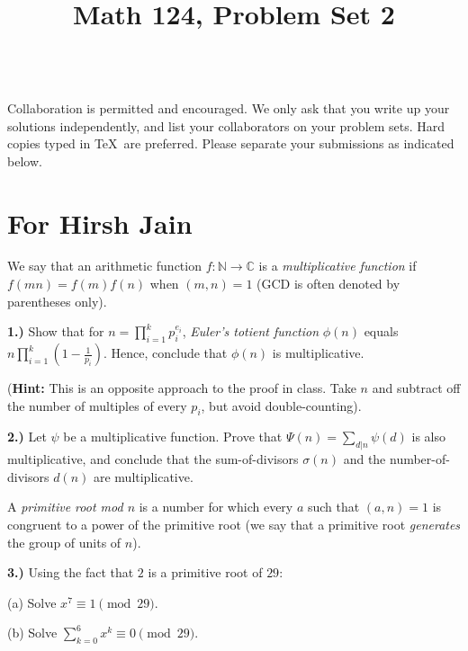 \documentclass[10pt]{amsart}
\title{Math 124, Problem Set 2}
\begin{document}
\maketitle

\\
 Collaboration is permitted and encouraged. We only ask that you write up your solutions independently, and list your collaborators on your problem sets. Hard copies typed in \TeX\  are preferred. Please separate your submissions as indicated below.

\section*{For Hirsh Jain}

\noindent We say that an arithmetic function $f: \mathbb{N} \to \mathbb{C}$ is a \emph{multiplicative function} if $f(mn) = f(m) f(n)$ when $(m,n) = 1$ (GCD is often denoted by parentheses only).

\medskip

{\bf 1.)} Show that for $n = \prod_{i=1}^k p_i^{e_i}$, \emph{Euler's totient function} $\phi(n)$ equals $n \prod_{i=1}^{k} \left(1 - \frac{1}{p_i}\right)$. Hence, conclude that $\phi(n)$ is multiplicative.

({\bf Hint:} This is an opposite approach to the proof in class. Take $n$ and subtract off the number of multiples of every $p_i$, but avoid double-counting).

\medskip

{\bf 2.)} Let $\psi$ be a multiplicative function. Prove that $\Psi(n) = \sum_{d|n} \psi(d)$ is also multiplicative, and conclude that  the sum-of-divisors $\sigma(n)$ and the number-of-divisors $d(n)$ are multiplicative.

\medskip

\noindent A \emph{primitive root mod $n$} is a number for which every $a$ such that $(a, n) = 1$ is congruent to a power of the primitive root (we say that a primitive root \emph{generates} the group of units of $n$).

\medskip

{\bf 3.)} Using the fact that $2$ is a primitive root of $29$:

\smallskip

(a) Solve $x^7 \equiv 1 \pmod{29}$.

\smallskip

(b) Solve $\sum_{k=0}^6 x^k \equiv 0 \pmod{29}$.
\end{document}
